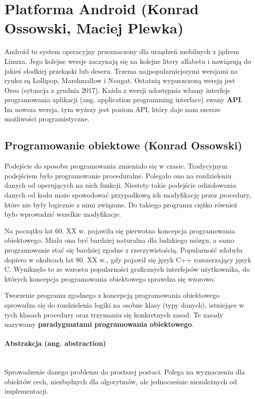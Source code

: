 \section{Platforma Android (Konrad Ossowski, Maciej Plewka)}
Android to system operacyjny przeznaczony dla urządzeń mobilnych z jądrem Linuxa. Jego kolejne wersje zaczynają się na kolejne litery alfabetu i nawiązują do jakieś słodkiej przekąski lub deseru. Trzema najpopularniejszymi wersjami na rynku są Lollipop, Marshmallow i Nougat. Ostatnią wypuszczoną wersją jest Oreo (sytuacja z grudnia 2017). Każda z wersji udostępnia własny interfejs programowania aplikacji (ang. application programming interface) zwany \textbf{API}. Im nowsza wersja, tym wyższy jest poziom API, który daje nam szersze możliwości programistyczne.
\subsection{Programowanie obiektowe (Konrad Ossowski)}
Podejście do sposobu programowania zmieniało się w czasie. Tradycyjnym podejściem było programowanie proceduralne. Polegało ono na rozdzieleniu danych od operujących na nich funkcji. Niestety takie podejście odizolowania danych od kodu może spowodować przypadkową ich modyfikację przez procedury, które nie były logicznie z nimi związane. Do takiego programu ciężko również było wprowadzić wszelkie modyfikacje. \par
Na początku lat 60. XX w. pojawiła się pierwotna koncepcja programowania obiektowego. Miała ona być bardziej naturalna dla ludzkiego mózgu, a samo programowanie stać się bardziej zgodne z rzeczywistością. Popularność zdobyła dopiero w okolicach lat 80. XX w., gdy pojawił się język C++ rozszerzający język C. Wyniknęło to ze wzrostu popularności graficznych interfejsów użytkownika, do których koncepcja programowania obiektowego sprawdza się wzorowo.\par Tworzenie programu zgodnego z koncepcją programowania obiektowego sprowadza się do rozdzielenia logiki na osobne klasy (typy danych), istniejące w tych klasach procedury oraz trzymaniu się konkretnych zasad. Te zasady nazywamy \textbf{paradygmatami programowania obiektowego}.
\paragraph{Abstrakcja (ang. abstraction)}\mbox{}\\ Sprowadzenie danego problemu do prostszej postaci. Polega na wyznaczeniu dla obiektów cech, niezbędnych dla algorytmów, ale jednocześnie niezależnych od implementacji.
